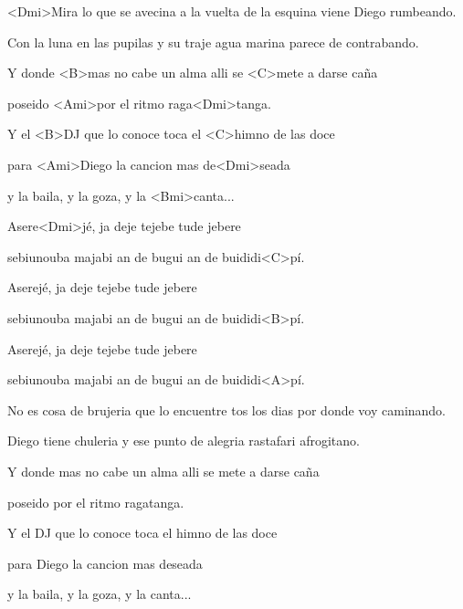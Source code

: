 

\zs
<Dmi>Mira lo que se avecina a la vuelta de la esquina viene Diego rumbeando.

Con la luna en las pupilas y su traje agua marina parece de contrabando.


Y donde <B>mas no cabe un alma alli se <C>mete a darse caña

poseido <Ami>por el ritmo raga<Dmi>tanga.

Y el <B>DJ que lo conoce toca el <C>himno de las doce

para <Ami>Diego la cancion mas de<Dmi>seada

y la baila, y la goza, y la <Bmi>canta...
\ks

\zr
Asere<Dmi>jé, ja deje tejebe tude jebere

sebiunouba majabi an de bugui an de buididi<C>pí.

Aserejé, ja deje tejebe tude jebere

sebiunouba majabi an de bugui an de buididi<B>pí.

Aserejé, ja deje tejebe tude jebere

sebiunouba majabi an de bugui an de buididi<A>pí.
\kr

\zs
No es cosa de brujeria
que lo encuentre tos los dias
por donde voy caminando.

Diego tiene chuleria
y ese punto de alegria
rastafari afrogitano.

Y donde mas no cabe un alma alli se mete a darse caña

poseido por el ritmo ragatanga.

Y el DJ que lo conoce toca el himno de las doce

para Diego la cancion mas deseada

y la baila, y la goza, y la canta...
\ks

\zr
\kr

\kp
